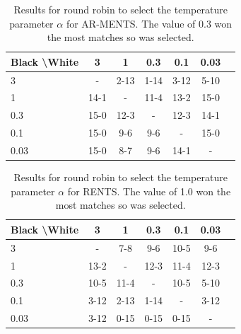     \begin{table}[]
    \centering
        \begin{tabular}{l|cccccc}
            \textbf{Black \textbackslash White}     & 3  & 1   & 0.3   & 0.1    & 0.03    \\ 
            \hline
                                    3            & -     	&  2-13 		& 1-14  		& 3-12  		& 5-10  		\\
                                    1            &  14-1 		& -     	& 11-4 		& 13-2  		& 15-0  		\\
                                    0.3          &  15-0  	&  12-3  	&   -   &  12-3 		& 14-1  		\\
                                    0.1          &   15-0		&  9-6 		&  9-6 		& -     	&  15-0 		\\
                                    0.03         &   15-0		&  8-7 		&  9-6 		& 14-1  		&   -   	\\    
        \end{tabular}
        \caption{Results for round robin to select the temperature parameter $\alpha$ for AR-MENTS. The value of 0.3 won the most matches so was selected. \label{tab:x040}}
    \end{table}
    
    \begin{table}[]
    \centering
        \begin{tabular}{l|cccccc}
            \textbf{Black \textbackslash White}     & 3  & 1   & 0.3   & 0.1    & 0.03    \\ 
            \hline
                                    3            & -     	&   	7-8	&  9-6 		&  10-5 		&  9-6 		\\
                                    1            &  13-2 		& -     	& 12-3 		& 11-4  		&  12-3 		\\
                                    0.3          &   10-5 	& 11-4   	&   -   &  10-5 		&  5-10 		\\
                                    0.1          &   3-12		&  2-13 		& 1-14  		& -     	&  3-12 		\\
                                    0.03         &   3-12		&  0-15 		&  0-15 		&  0-15 		&   -   	\\    
        \end{tabular}
        \caption{Results for round robin to select the temperature parameter $\alpha$ for RENTS. The value of 1.0 won the most matches so was selected. \label{tab:w050}}
    \end{table}
    
